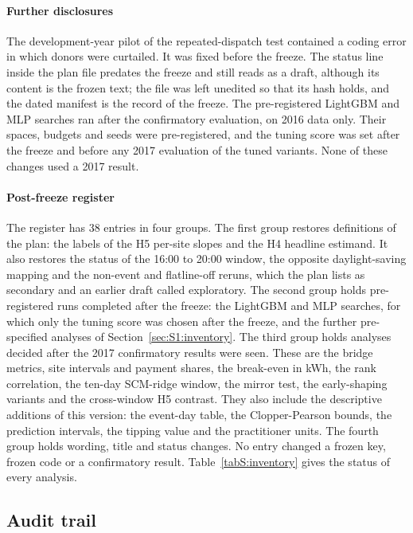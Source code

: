 \paragraph{Further disclosures} The development-year pilot of the repeated-dispatch test contained a coding error in which donors were curtailed. It was fixed before the freeze. The status line inside the plan file predates the freeze and still reads as a draft, although its content is the frozen text; the file was left unedited so that its hash holds, and the dated manifest is the record of the freeze. The pre-registered LightGBM and MLP searches ran after the confirmatory evaluation, on 2016 data only. Their spaces, budgets and seeds were pre-registered, and the tuning score was set after the freeze and before any 2017 evaluation of the tuned variants. None of these changes used a 2017 result.

\paragraph{Post-freeze register} The register has 38 entries in four groups. The first group restores definitions of the plan: the labels of the H5 per-site slopes and the H4 headline estimand. It also restores the status of the 16:00 to 20:00 window, the opposite daylight-saving mapping and the non-event and flatline-off reruns, which the plan lists as secondary and an earlier draft called exploratory. The second group holds pre-registered runs completed after the freeze: the LightGBM and MLP searches, for which only the tuning score was chosen after the freeze, and the further pre-specified analyses of Section~\ref{sec:S1:inventory}. The third group holds analyses decided after the 2017 confirmatory results were seen. These are the bridge metrics, site intervals and payment shares, the break-even in kWh, the rank correlation, the ten-day SCM-ridge window, the mirror test, the early-shaping variants and the cross-window H5 contrast. They also include the descriptive additions of this version: the event-day table, the Clopper-Pearson bounds, the prediction intervals, the tipping value and the practitioner units. The fourth group holds wording, title and status changes. No entry changed a frozen key, frozen code or a confirmatory result. Table~\ref{tabS:inventory} gives the status of every analysis.

\subsection{Audit trail}\label{sec:S1:audit}

